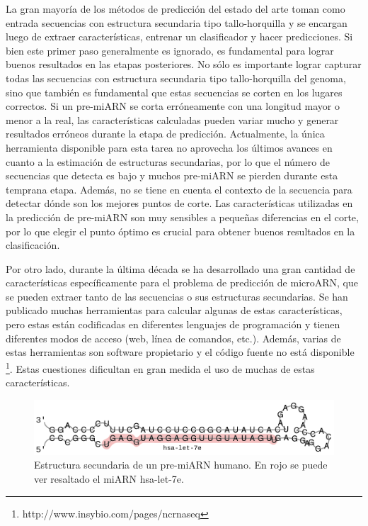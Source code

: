 La gran mayoría de los métodos de predicción del estado del arte toman como entrada secuencias con estructura secundaria tipo tallo-horquilla y se encargan
luego de extraer características, entrenar un clasificador y hacer predicciones. Si bien este primer paso generalmente es ignorado, es fundamental para lograr
buenos resultados en las etapas posteriores. No sólo es importante lograr capturar todas las secuencias con estructura secundaria tipo tallo-horquilla del
genoma, sino que también es fundamental que estas secuencias se corten en los lugares correctos. Si un pre-miARN se corta erróneamente con una longitud mayor
o menor a la real, las características calculadas pueden variar mucho y generar resultados erróneos durante la etapa de predicción. Actualmente, la única
herramienta disponible para esta tarea \citep{durbin1999einverted} no aprovecha los últimos avances en cuanto a la estimación de estructuras secundarias, por
lo que el número de secuencias que detecta es bajo y muchos pre-miARN se pierden durante esta temprana etapa. Además, no se tiene en cuenta el contexto de la
secuencia para detectar dónde son los mejores puntos de corte. Las características utilizadas en la predicción de pre-miARN son muy sensibles a pequeñas
diferencias en el corte, por lo que elegir el punto óptimo es crucial para obtener buenos resultados en la clasificación.

Por otro lado, durante la última década se ha desarrollado una gran cantidad de características específicamente para el problema de predicción de
microARN, que se pueden extraer tanto de las secuencias o sus estructuras secundarias. Se han publicado muchas herramientas para calcular algunas de estas
características, pero estas están codificadas en diferentes lenguajes de programación y tienen diferentes modos de acceso (web, línea de comandos, etc.).
Además, varias de estas herramientas son software propietario y el código fuente no está disponible \footnote{http://www.insybio.com/pages/ncrnaseq}. Estas
cuestiones dificultan en gran medida el uso de muchas de estas características.

\begin{figure}[tpb]
	\centering
	\includegraphics[width=\textwidth]{fig/mirna.pdf}
	\caption[Estructura secundaria de un pre-miARN]{Estructura secundaria de un pre-miARN humano. En rojo se puede ver resaltado el miARN hsa-let-7e.}
	\label{fig:mirna}
\end{figure}

